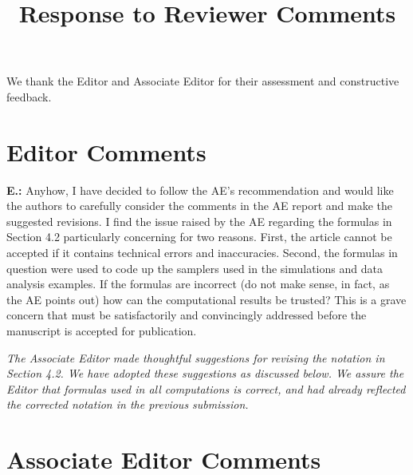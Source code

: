 \documentclass[letterpaper, parskip]{scrartcl}
\newcommand{\pointRaised}[2]{%
	\textbf{#1.\theresponsectr:} #2
}
\newcounter{responsectr}[section]     %
\newcommand{\reply}[1]{%
	\refstepcounter{responsectr}%
		\begin{tcolorbox}
			\itshape #1
		\end{tcolorbox}
}
\begin{document}

	\title{Response to Reviewer Comments}
	\maketitle
	
We thank the Editor and Associate Editor for their assessment and constructive feedback.
	

\section{Editor Comments}



\pointRaised{E}{Anyhow, I have decided to follow the AE’s recommendation and would like the authors to carefully consider the comments in the AE report and make the suggested revisions. I find the issue raised by the AE regarding the formulas in Section 4.2 particularly concerning for two reasons. First, the article cannot be accepted if it contains technical errors and inaccuracies. Second, the formulas in question were used to code up the samplers used in the simulations and data analysis examples. If the formulas are incorrect (do not make sense, in fact, as the AE points out) how can the computational results be trusted? This is a grave concern that must be satisfactorily and convincingly addressed before the manuscript is accepted for publication.}

\reply{The Associate Editor made thoughtful suggestions for revising the notation in Section 4.2. We have adopted these suggestions as discussed below. We assure the Editor that formulas used in all computations is correct, and had already reflected the corrected notation in the previous submission.}

\section{Associate Editor Comments}
\end{document}
